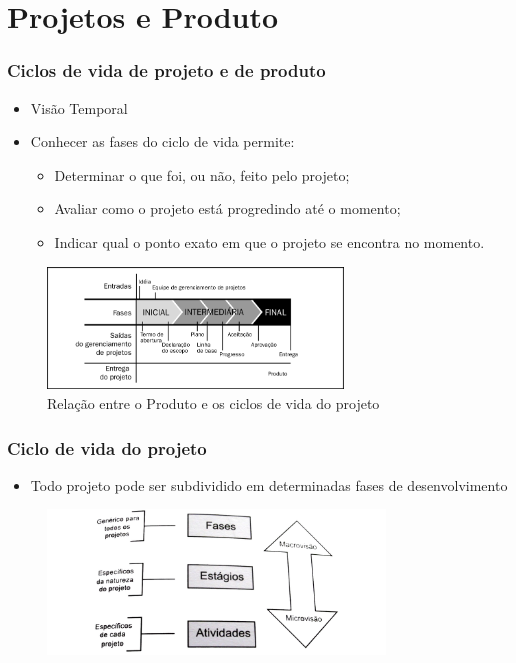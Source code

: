 \section{Projetos e Produto}
\begin{frame}
 \frametitle{Ciclos de vida de projeto e de produto}
 \begin{itemize}
  \item Visão Temporal
  \item Conhecer as fases do ciclo de vida permite:
  \begin{itemize}
   \item Determinar o que foi, ou não, feito pelo projeto;
   \item  Avaliar como o projeto está progredindo até o momento;
   \item  Indicar qual o ponto exato em que o projeto se encontra no momento.
    \end{itemize}
 \end{itemize}
\begin{figure}
 \centering
 \includegraphics[width = 0.7\textwidth]{figs/ProdCicloVida.png}
 \caption{Relação entre o Produto e os ciclos de vida do projeto}
\end{figure}
\end{frame}

\begin{frame}
 \frametitle{Ciclo de vida do projeto}
 \begin{itemize}
  \item Todo projeto pode ser subdividido em determinadas fases de desenvolvimento
 \end{itemize}
\begin{figure}
 \centering
 \includegraphics[width = 0.8\textwidth]{figs/fig2.png}
\end{figure}
\end{frame}

